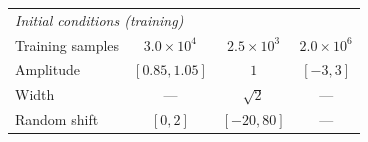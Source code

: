 \documentclass[letterpaper]{article} %
\begin{document}
\begin{table}[h]
\begin{tabular}{l ccc}
\midrule
\multicolumn{4}{l}{\textit{Initial conditions (training)}}\\
Training samples & $3.0{\times}10^{4}$ & $2.5{\times}10^{3}$ & $2.0{\times}10^{6}$ \\
Amplitude        & $[0.85,1.05]$ & $1$ & $[-3,3]$ \\
Width            & --- & $\sqrt{2}$ & --- \\
Random shift     & $[0,2]$ & $[-20,80]$ & --- \\

\bottomrule
\end{tabular}
\end{table}
\end{document}
